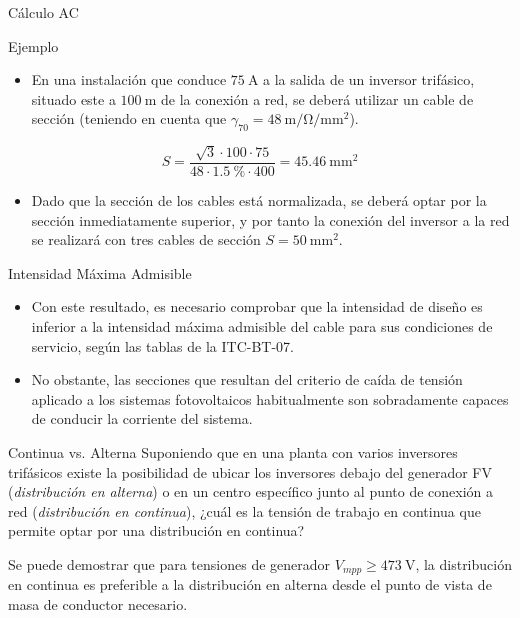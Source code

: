 \documentclass[aspectratio=169, usenames,svgnames,dvipsnames]{beamer}
\begin{document}
\begin{frame}[label={sec:org82552ce}]{Cálculo AC}
\begin{block}{Ejemplo}
\begin{itemize}
\item En una instalación que conduce \(\qty{75}{\ampere}\) a la salida de un
inversor trifásico, situado este a \(\qty{100}{\meter}\) de la conexión
a red, se deberá utilizar un cable de sección (teniendo en cuenta
que \(\gamma_{70} = \qty{48}{\meter\per\ohm\per\milli\meter\squared}\)).
\end{itemize}


\[
  S=\frac{\sqrt{3} \cdot 100 \cdot 75}{48 \cdot \qty{1.5}{\percent}\cdot400}=\qty{45.46}{\milli\meter\squared}
\]

\begin{itemize}
\item Dado que la sección de los cables está normalizada, se deberá optar
por la sección inmediatamente superior, y por tanto la conexión del
inversor a la red se realizará con tres cables de sección
\(S=\qty{50}{\milli\meter\squared}\).
\end{itemize}
\end{block}
\end{frame}

\begin{frame}[label={sec:org5a16182}]{Intensidad Máxima Admisible}
\begin{itemize}
\item Con este resultado, es necesario comprobar que la intensidad de diseño es inferior a la intensidad máxima admisible del cable para sus condiciones de servicio, según las tablas de la ITC-BT-07.

\item No obstante, las secciones que resultan del criterio de caída de tensión aplicado a los sistemas fotovoltaicos habitualmente son sobradamente capaces de conducir la corriente del sistema.
\end{itemize}
\end{frame}

\begin{frame}[label={sec:org0c9b1ce}]{Continua vs. Alterna}
Suponiendo que en una planta con varios inversores trifásicos existe la
posibilidad de ubicar los inversores debajo del generador FV
(\emph{distribución en alterna}) o en un centro específico junto al punto de
conexión a red (\emph{distribución en continua}), \alert{¿cuál es la tensión de
trabajo en continua que permite optar por una distribución en continua?}

Se puede demostrar que para tensiones de generador \(V_{mpp} \geq
\qty{473}{\volt}\), la distribución en continua es preferible a la
distribución en alterna desde el punto de vista de masa de conductor
necesario.
\end{frame}
\end{document}
